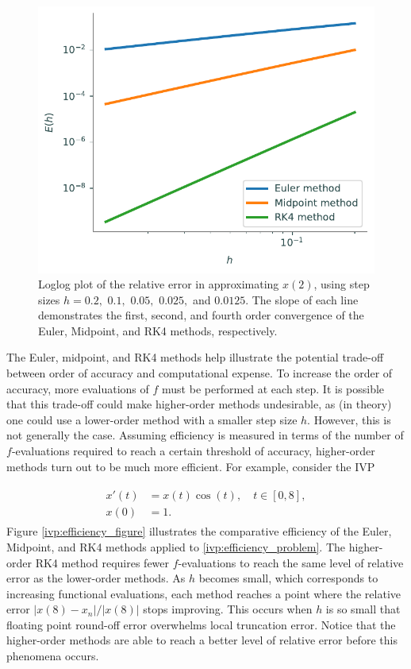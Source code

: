 \begin{figure}[H]
\centering
\includegraphics[width=\textwidth]{figures/prob2.pdf}
\caption{Loglog plot of the relative error in approximating $x(2)$, using step sizes $h = 0.2,$ $0.1,$ $0.05,$ $0.025,$ and $0.0125$.
The slope of each line demonstrates the first, second, and fourth order convergence of the Euler, Midpoint, and RK4 methods, respectively.}
\label{ivp:relative_error}
\end{figure}

The Euler, midpoint, and RK4 methods help illustrate the potential trade-off between order of accuracy and computational expense.
To increase the order of accuracy, more evaluations of $f$ must be performed at each step.
It is possible that this trade-off could make higher-order methods undesirable, as (in theory) one could use a lower-order method with a smaller step size $h$.
However, this is not generally the case.
Assuming efficiency is measured in terms of the number of $f$-evaluations required to reach a certain threshold of accuracy, higher-order methods turn out to be much more efficient.
For example, consider the IVP

\begin{align}
	\begin{split}
		x'(t) &= x(t) \cos(t), \quad t \in [0,8],\\
		x(0) &= 1. 
	\end{split}
	\label{ivp:efficiency_problem}
\end{align}
Figure \ref{ivp:efficiency_figure} illustrates the comparative efficiency of the Euler, Midpoint, and RK4 methods applied to \eqref{ivp:efficiency_problem}. 
The higher-order RK4 method requires fewer $f$-evaluations to reach the same level of relative error as the lower-order methods.
As $h$ becomes small, which corresponds to increasing functional evaluations, each method reaches a point where the relative error $|x(8)-x_n|/{|x(8)|}$ stops improving.
This occurs when $h$ is so small that floating point round-off error overwhelms local truncation error. Notice that the higher-order methods are able to reach a better level of relative error before this phenomena occurs.

